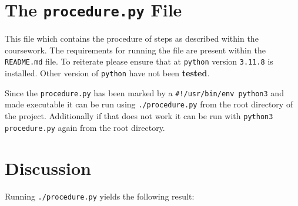 \documentclass[article]{uom-coursework}
\begin{document}
\section{The \texttt{procedure.py} File}

This file which contains the procedure of steps as described
within the coursework. The requirements for running the file are
present within the \texttt{README.md} file. To reiterate
please ensure that at \texttt{python} version \texttt{3.11.8}
is installed. Other version of \texttt{python} have not
been \textbf{tested}.

Since the \texttt{procedure.py} has been marked by a
\texttt{\#!/usr/bin/env python3} and made executable it can be
run using \texttt{./procedure.py} from the root directory of the
project. Additionally if that does not work it can be run with
\texttt{python3 procedure.py} again from the root directory.

\section{Discussion}

Running \texttt{./procedure.py} yields the following
result:
\end{document}
